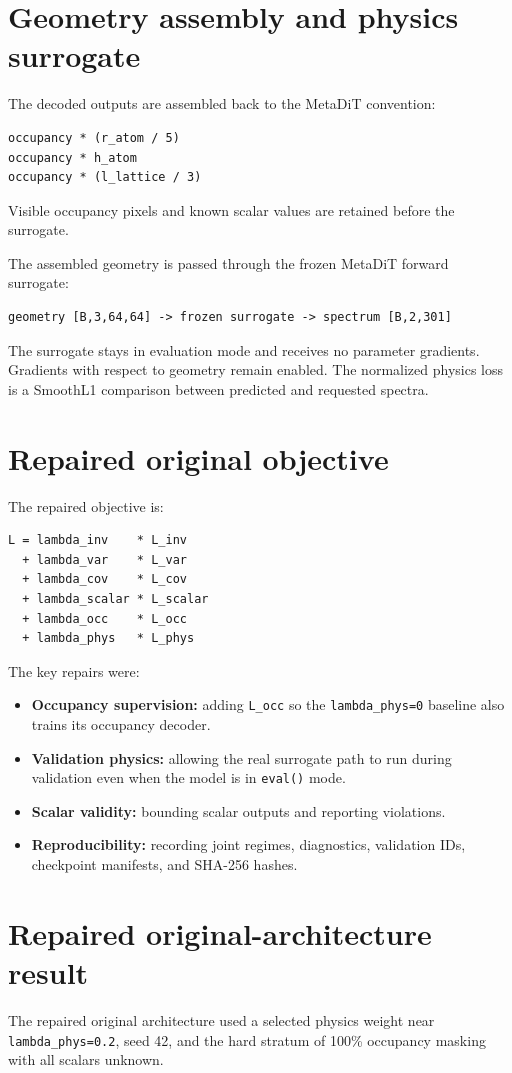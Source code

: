 \documentclass[11pt,a4paper]{article}
\begin{document}
\section{Geometry assembly and physics surrogate}
The decoded outputs are assembled back to the MetaDiT convention:
\begin{lstlisting}
occupancy * (r_atom / 5)
occupancy * h_atom
occupancy * (l_lattice / 3)
\end{lstlisting}
Visible occupancy pixels and known scalar values are retained before the
surrogate.

The assembled geometry is passed through the frozen MetaDiT forward surrogate:
\begin{lstlisting}
geometry [B,3,64,64] -> frozen surrogate -> spectrum [B,2,301]
\end{lstlisting}
The surrogate stays in evaluation mode and receives no parameter gradients.
Gradients with respect to geometry remain enabled. The normalized physics loss
is a SmoothL1 comparison between predicted and requested spectra.

\section{Repaired original objective}
The repaired objective is:
\begin{lstlisting}
L = lambda_inv    * L_inv
  + lambda_var    * L_var
  + lambda_cov    * L_cov
  + lambda_scalar * L_scalar
  + lambda_occ    * L_occ
  + lambda_phys   * L_phys
\end{lstlisting}

The key repairs were:
\begin{itemize}[leftmargin=*]
\item \textbf{Occupancy supervision:} adding \texttt{L\_occ} so the
\texttt{lambda\_phys=0} baseline also trains its occupancy decoder.
\item \textbf{Validation physics:} allowing the real surrogate path to run
during validation even when the model is in \texttt{eval()} mode.
\item \textbf{Scalar validity:} bounding scalar outputs and reporting violations.
\item \textbf{Reproducibility:} recording joint regimes, diagnostics,
validation IDs, checkpoint manifests, and SHA-256 hashes.
\end{itemize}

\section{Repaired original-architecture result}
The repaired original architecture used a selected physics weight near
\texttt{lambda\_phys=0.2}, seed 42, and the hard stratum of 100\% occupancy
masking with all scalars unknown.
\end{document}
